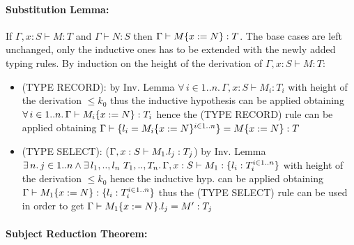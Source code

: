 \paragraph*{Substitution Lemma:\\}
If $\Gamma, x: S \vdash M: T$ and $\Gamma \vdash N: S$ then $\Gamma \vdash M\{x:=N\}: T$.
The base cases are left unchanged, only the inductive ones has to be extended with the newly
added typing rules.
By induction on the height of the derivation of $\Gamma, x: S \vdash M: T$:
\begin{itemize}
	\item (TYPE RECORD): by Inv. Lemma $\forall\, i \in 1..n.\, \Gamma, x: S \vdash M_i: T_i$ with height
	      of the derivation  $\le k_0$ thus the inductive hypothesis can be applied obtaining\\
	      $\forall\, i \in 1..n.\, \Gamma \vdash M_i\{x:=N\}: T_i$ hence the (TYPE RECORD) rule
	      can be applied obtaining
	      $\Gamma \vdash \{l_i=M_i\{x:=N\}^{i \in 1..n}\}= M\{x:=N\}: T$
	\item (TYPE SELECT): ($\Gamma, x: S \vdash M_1.l_j: T_j$) by Inv. Lemma\\
	      $\exists\, n.\, j \in 1..n \wedge \exists\, l_1,..,l_n\ T_1,..,T_n.\, \Gamma, x: S \vdash M_1 : \{l_i: T_i^{i \in 1..n}\}$
	      with height of the derivation $\le k_0$ hence the inductive hyp. can be applied obtaining
	      $\Gamma \vdash M_1\{x:=N\} : \{l_i: T_i^{i \in 1..n}\}$ thus the (TYPE SELECT) rule
	      can be used in order to get $\Gamma \vdash M_1\{x:=N\}.l_j = M': T_j$
\end{itemize}


\paragraph*{Subject Reduction Theorem:\\}

